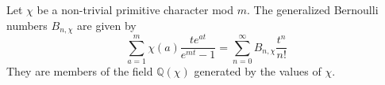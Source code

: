 \documentclass[12pt]{article}
\begin{document}
Let $\chi$ be a non-trivial primitive character mod $m$.  The generalized Bernoulli numbers $B_{n,\chi}$ are given by
\[
\sum_{a=1}^m \chi(a)\frac{te^{at}}{e^{mt}-1}=\sum_{n=0}^\infty B_{n,\chi}\frac{t^n}{n!}
\]
They are members of the field $\mathbb{Q}(\chi)$ generated by the values of $\chi$.
\end{document}
